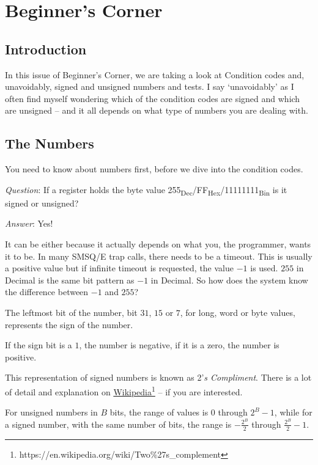 
\chapter{Beginner's Corner}

\section{Introduction}

In this issue of Beginner's Corner, we are taking a look at Condition
codes and, unavoidably, signed and unsigned numbers and tests. I say
`unavoidably' as I often find myself wondering which of the condition
codes are signed and which are unsigned -- and it all depends on
what type of numbers you are dealing with.

\section{The Numbers}

You need to know about numbers first, before we dive into the condition
codes. 

\emph{Question}: If a register holds the byte value 255\textsubscript{Dec}/FF\textsubscript{Hex}/11111111\textsubscript{Bin}
is it signed or unsigned?

\emph{Answer}: Yes!

It can be either because it actually depends on what you, the programmer,
wants it to be. In many SMSQ/E trap calls, there needs to be a timeout.
This is usually a positive value but if infinite timeout is requested,
the value $-1$ is used. $255$ in Decimal is the same bit pattern
as $-1$ in Decimal. So how does the system know the difference between
$-1$ and $255$?

The leftmost bit of the number, bit $31$, $15$ or $7$, for long,
word or byte values, represents the sign of the number. 

If the sign bit is a $1$, the number is negative, if it is a zero,
the number is positive. 

This representation of signed numbers is known as 2'\emph{s Compliment}.
There is a lot of detail and explanation on \href{https://en.wikipedia.org/wiki/Two\%27s_complement}{Wikipedia}\footnote{https://en.wikipedia.org/wiki/Two\%27s\_complement}
-- if you are interested. 

For unsigned numbers in $B$ bits, the range of values is $0$ through
$2^{B}-1$, while for a signed number, with the same number of bits,
the range is $-\frac{2^{B}}{2}$ through $\frac{2^{B}}{2}-1$.

